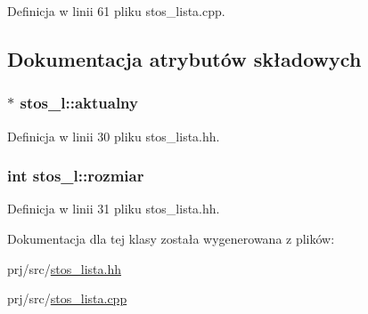 \-Definicja w linii 61 pliku stos\-\_\-lista.\-cpp.



\subsection{\-Dokumentacja atrybutów składowych}
\hypertarget{classstos__l_ac11dcea9266fd7258405656624cfc1f3}{
\subsubsection[{aktualny}]{$\ast$ {\bf stos\-\_\-l\-::aktualny}}}\label{classstos__l_ac11dcea9266fd7258405656624cfc1f3}


\-Definicja w linii 30 pliku stos\-\_\-lista.\-hh.

\hypertarget{classstos__l_a2194604d2193df66d042756db760d1ff}{
\subsubsection[{rozmiar}]{\setlength{\rightskip}{0pt plus 5cm}int {\bf stos\-\_\-l\-::rozmiar}}}\label{classstos__l_a2194604d2193df66d042756db760d1ff}


\-Definicja w linii 31 pliku stos\-\_\-lista.\-hh.



\-Dokumentacja dla tej klasy została wygenerowana z plików\-:\begin{DoxyCompactItemize}
\item 
prj/src/\hyperlink{stos__lista_8hh}{stos\-\_\-lista.\-hh}\item 
prj/src/\hyperlink{stos__lista_8cpp}{stos\-\_\-lista.\-cpp}\end{DoxyCompactItemize}
